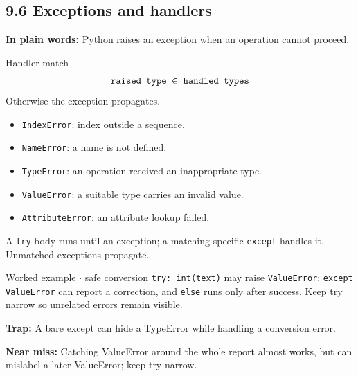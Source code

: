 \documentclass[11pt]{article}
\begin{document}
\begin{keepsection}
\section{9.6 Exceptions and handlers}

\begin{plainbox}\textbf{In plain words:} Python raises an exception when an operation cannot proceed.\end{plainbox}

\begin{equationcard}{Handler match}
\[ \begin{gathered} \texttt{raised type \ensuremath{\in} handled types} \end{gathered} \]
{\small Otherwise the exception propagates.}
\end{equationcard}

\begin{itemize}
\item \texttt{IndexError}: index outside a sequence.
\item \texttt{NameError}: a name is not defined.
\item \texttt{TypeError}: an operation received an inappropriate type.
\item \texttt{ValueError}: a suitable type carries an invalid value.
\item \texttt{AttributeError}: an attribute lookup failed.
\end{itemize}

A \texttt{try} body runs until an exception; a matching specific \texttt{except} handles it. Unmatched exceptions propagate.

\begin{workedbox}{Worked example \ensuremath{\cdot} safe conversion}
\texttt{try: int(text)} may raise \texttt{ValueError}; \texttt{except ValueError} can report a correction, and \texttt{else} runs only after success. Keep try narrow so unrelated errors remain visible.
\end{workedbox}

\begin{notebox}\textbf{Trap:} A bare except can hide a TypeError while handling a conversion error.\end{notebox}

\begin{notebox}\textbf{Near miss:} Catching ValueError around the whole report almost works, but can mislabel a later ValueError; keep try narrow.\end{notebox}


\end{keepsection}
\end{document}
